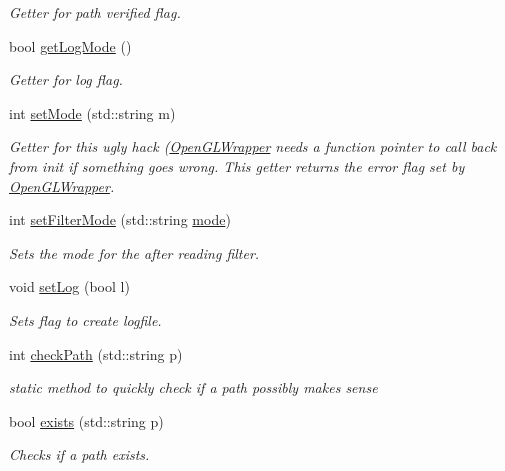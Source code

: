 \begin{DoxyCompactItemize}
\begin{DoxyCompactList}\small\item\em Getter for path verified flag. \end{DoxyCompactList}\item 
bool \mbox{\hyperlink{classSteganoMessage_ab560ec6c0d3e99c19822ca1119a68b92}{get\+Log\+Mode}} ()
\begin{DoxyCompactList}\small\item\em Getter for log flag. \end{DoxyCompactList}\item 
int \mbox{\hyperlink{classSteganoMessage_a3e06a73baa5744b5eb9152f4ae65f458}{set\+Mode}} (std\+::string m)
\begin{DoxyCompactList}\small\item\em Getter for this ugly hack (\mbox{\hyperlink{classOpenGLWrapper}{Open\+G\+L\+Wrapper}} needs a function pointer to call back from init if something goes wrong. This getter returns the error flag set by \mbox{\hyperlink{classOpenGLWrapper}{Open\+G\+L\+Wrapper}}. \end{DoxyCompactList}\item 
int \mbox{\hyperlink{classSteganoMessage_a5c3ef910b17f4bbe32a73a33be9d7586}{set\+Filter\+Mode}} (std\+::string \mbox{\hyperlink{classSteganoMessage_a8772194b7823da730648f8d4c06334a8}{mode}})
\begin{DoxyCompactList}\small\item\em Sets the mode for the after reading filter. \end{DoxyCompactList}\item 
void \mbox{\hyperlink{classSteganoMessage_a438e9d5189a8e3b83021fada4a6a469c}{set\+Log}} (bool l)
\begin{DoxyCompactList}\small\item\em Sets flag to create logfile. \end{DoxyCompactList}\item 
int \mbox{\hyperlink{classSteganoMessage_a9d87adef1584cc184ccd4b5d86fba744}{check\+Path}} (std\+::string p)
\begin{DoxyCompactList}\small\item\em static method to quickly check if a path possibly makes sense \end{DoxyCompactList}\item 
bool \mbox{\hyperlink{classSteganoMessage_acc5a49a35b46d8bf4c40cca8b8c5a52b}{exists}} (std\+::string p)
\begin{DoxyCompactList}\small\item\em Checks if a path exists. \end{DoxyCompactList}\item 

\end{DoxyCompactItemize}
